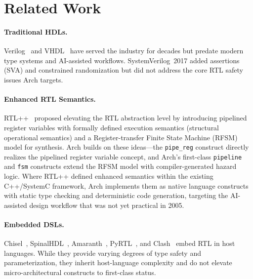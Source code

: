 \documentclass[11pt,twocolumn]{article}
\begin{document}
\section{Related Work}\label{sec:related}

\paragraph{Traditional HDLs.}
Verilog~\cite{ieee1800} and VHDL~\cite{ieee1076} have served the industry for decades but predate modern type systems and AI-assisted workflows. SystemVerilog~2017 added assertions (SVA) and constrained randomization but did not address the core RTL safety issues Arch targets.

\paragraph{Enhanced RTL Semantics.}
RTL++~\cite{rtlpp} proposed elevating the RTL abstraction level by introducing pipelined register variables with formally defined execution semantics (structural operational semantics) and a Register-transfer Finite State Machine (RFSM) model for synthesis. Arch builds on these ideas---the \texttt{pipe\_reg} construct directly realizes the pipelined register variable concept, and Arch's first-class \texttt{pipeline} and \texttt{fsm} constructs extend the RFSM model with compiler-generated hazard logic. Where RTL++ defined enhanced semantics within the existing C++/SystemC framework, Arch implements them as native language constructs with static type checking and deterministic code generation, targeting the AI-assisted design workflow that was not yet practical in 2005.

\paragraph{Embedded DSLs.}
Chisel~\cite{chisel}, SpinalHDL~\cite{spinalhdl}, Amaranth~\cite{amaranth}, PyRTL~\cite{pyrtl}, and Clash~\cite{clash} embed RTL in host languages. While they provide varying degrees of type safety and parameterization, they inherit host-language complexity and do not elevate micro-architectural constructs to first-class status.
\end{document}
